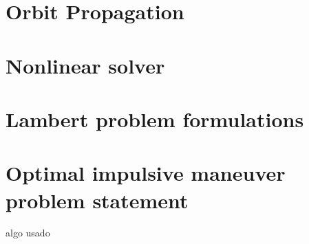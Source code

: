 \section{Orbit Propagation}

\section{Nonlinear solver}

\section{Lambert problem formulations}

\section{Optimal impulsive maneuver problem statement}

algo usado